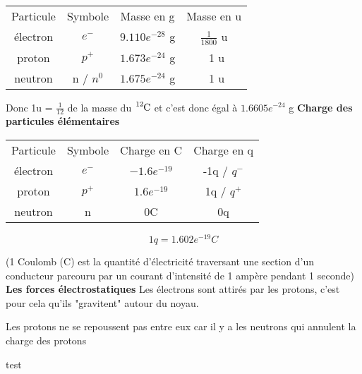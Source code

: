 \documentclass{article}
\begin{document}
\begin{table}[-h]
  \begin{center}
    \begin{tabular}{||c|c|c|c||}
      \hline
      Particule & Symbole   & Masse en g      & Masse en u         \\
      électron  & $e^-$     & $9.110e^{-28}$ g & $\frac{1}{1800}$ u \\
      proton    & $p^+$     & $1.673e^{-24}$ g & ~1 u               \\
      neutron   & n / $n^0$ & $1.675e^{-24}$ g & ~1 u              \\
      \hline
    \end{tabular}
  \end{center}
\end{table}

\newline

Donc 1u = $\frac{1}{12}$ de la masse du $\ce{^{12}C}$ et c'est donc égal à $1.6605e^{-24}$ g
\bigbreak
\textbf{Charge des particules élémentaires}

\begin{table}[-h]
  \begin{center}
    \begin{tabular}{||c|c|c|c||}
      \hline
      Particule & Symbole & Charge en C   & Charge en q \\
      électron  & $e^-$   & $-1.6e^{-19}$ & -1q / $q^-$ \\
      proton    & $p^+$   & $1.6e^{-19}$  & 1q / $q^+$  \\
      neutron   & n       & 0C            & 0q         \\
      \hline
    \end{tabular}
  \end{center}
\end{table}

\begin{equation}
  1q = 1.602e^{-19} C
\end{equation}

(1 Coulomb (C) est la quantité d'électricité traversant une section d'un
conducteur parcouru par un courant d'intensité de 1 ampère pendant 1 seconde)
\bigbreak
\textbf{Les forces électrostatiques}
\bigbreak
Les électrons sont attirés par les protons, c'est pour cela qu'ils "gravitent"
autour du noyau.

Les protons ne se repoussent pas entre eux car il y a les neutrons qui annulent
la charge des protons

test
\end{document}
